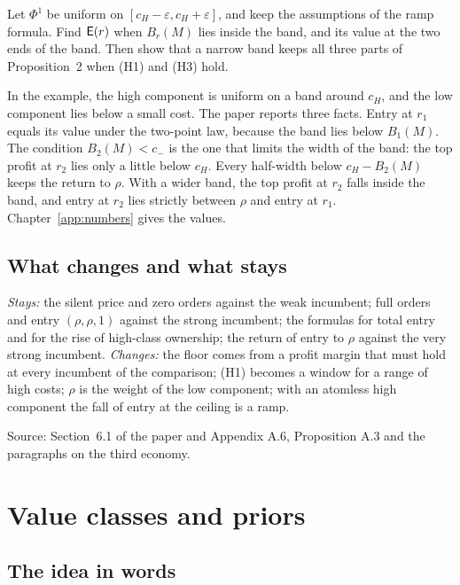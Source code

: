 \begin{checkyourself}
Let \(\Phi^1\) be uniform on \([c_H-\varepsilon,c_H+\varepsilon]\), and keep the assumptions of the ramp formula.
Find \(\mathsf{E}(r)\) when \(B_r(M)\) lies inside the band, and its value at the two ends of the band.
Then show that a narrow band keeps all three parts of Proposition~2 when (H1) and (H3) hold.
\label{q:robustness-ramp}
\end{checkyourself}

In the example, the high component is uniform on a band around \(c_H\), and the low component lies below a small cost.
The paper reports three facts.
Entry at \(r_1\) equals its value under the two-point law, because the band lies below \(B_1(M)\).
The condition \(B_2(M)<c_-\) is the one that limits the width of the band: the top profit at \(r_2\) lies only a little below \(c_H\). Every half-width below \(c_H-B_2(M)\) keeps the return to \(\rho\).
With a wider band, the top profit at \(r_2\) falls inside the band, and entry at \(r_2\) lies strictly between \(\rho\) and entry at \(r_1\).
Chapter~\ref{app:numbers} gives the values.

\subsection{What changes and what stays}

\emph{Stays:} the silent price and zero orders against the weak incumbent; full orders and entry \((\rho,\rho,1)\) against the strong incumbent; the formulas for total entry and for the rise of high-class ownership; the return of entry to \(\rho\) against the very strong incumbent.
\emph{Changes:} the floor comes from a profit margin that must hold at every incumbent of the comparison; (H1) becomes a window for a range of high costs; \(\rho\) is the weight of the low component; with an atomless high component the fall of entry at the ceiling is a ramp.

{\small\color{notegrey}Source: Section~6.1 of the paper and Appendix A.6, Proposition A.3 and the paragraphs on the third economy.}

\section{Value classes and priors}\label{sec:robustness-classes}

\subsection{The idea in words}

